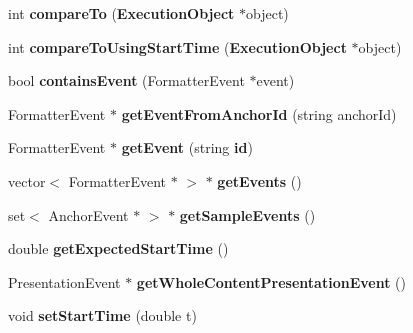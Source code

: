 \begin{CompactItemize}
\item 
int \textbf{compareTo} ({\bf ExecutionObject} $\ast$object)\label{classbr_1_1pucrio_1_1telemidia_1_1ginga_1_1ncl_1_1model_1_1components_1_1ExecutionObject_3fc125bea81b13de08ff57bd1d7e2b1d}

\item 
int \textbf{compareToUsingStartTime} ({\bf ExecutionObject} $\ast$object)\label{classbr_1_1pucrio_1_1telemidia_1_1ginga_1_1ncl_1_1model_1_1components_1_1ExecutionObject_4e63b27acd21ace8bf83121baaafef47}

\item 
bool \textbf{containsEvent} (FormatterEvent $\ast$event)\label{classbr_1_1pucrio_1_1telemidia_1_1ginga_1_1ncl_1_1model_1_1components_1_1ExecutionObject_d37c918823c242936049ba408f32935b}

\item 
FormatterEvent $\ast$ \textbf{getEventFromAnchorId} (string anchorId)\label{classbr_1_1pucrio_1_1telemidia_1_1ginga_1_1ncl_1_1model_1_1components_1_1ExecutionObject_eca81ca96f73dbcdbe98a479f02726f7}

\item 
FormatterEvent $\ast$ \textbf{getEvent} (string {\bf id})\label{classbr_1_1pucrio_1_1telemidia_1_1ginga_1_1ncl_1_1model_1_1components_1_1ExecutionObject_db4f63426c8ac156ff88be79741dafa6}

\item 
vector$<$ FormatterEvent $\ast$ $>$ $\ast$ \textbf{getEvents} ()\label{classbr_1_1pucrio_1_1telemidia_1_1ginga_1_1ncl_1_1model_1_1components_1_1ExecutionObject_fca757079125047461ec5a835b328ae7}

\item 
set$<$ AnchorEvent $\ast$ $>$ $\ast$ \textbf{getSampleEvents} ()\label{classbr_1_1pucrio_1_1telemidia_1_1ginga_1_1ncl_1_1model_1_1components_1_1ExecutionObject_168eabddabe1990a423f19337276dbf6}

\item 
double \textbf{getExpectedStartTime} ()\label{classbr_1_1pucrio_1_1telemidia_1_1ginga_1_1ncl_1_1model_1_1components_1_1ExecutionObject_99561c396f20c1a0750af4375adc0828}

\item 
PresentationEvent $\ast$ \textbf{getWholeContentPresentationEvent} ()\label{classbr_1_1pucrio_1_1telemidia_1_1ginga_1_1ncl_1_1model_1_1components_1_1ExecutionObject_8e1e2d2056b761bc3e0433a4a2bda27d}

\item 
void \textbf{setStartTime} (double t)\label{classbr_1_1pucrio_1_1telemidia_1_1ginga_1_1ncl_1_1model_1_1components_1_1ExecutionObject_4508ecb0d90e9d68af4d73b4b8d589a5}


\end{CompactItemize}
